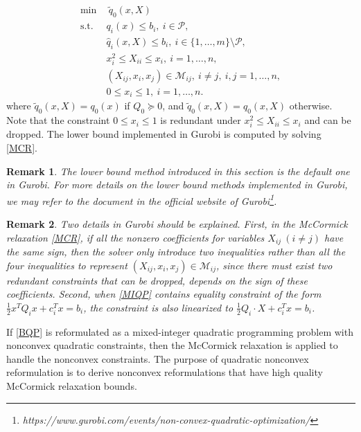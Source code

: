 \documentclass[pdflatex,sn-mathphys-num]{sn-jnl}%
\theoremstyle{thmstyleone}%
\theoremstyle{thmstyletwo}%
\newtheorem{remark}{Remark}%
\theoremstyle{thmstylethree}%
\begin{document}
\begin{equation}\label{MCR}
	\begin{aligned}
		\min ~&~ \tilde{q}_0(x,X) \\
		\mbox{s.t.} ~&q_{i}(x)\leq b_i,~i\in\mathcal{P},\\
		&\hat{q}_{i}(x,X)\leq b_i,~i\in\{1,\ldots,m\}\setminus \mathcal{P},\\
		&x_i^2\leq X_{ii} \leq x_i,~i=1,\ldots,n,\\
		&(X_{ij},x_i,x_j)\in \mathcal{M}_{ij}, ~i\neq j, ~i,j=1,\ldots,n,\\
		&0\leq x_i\leq 1,~i=1,\ldots,n.
	\end{aligned}
\end{equation}
where $\tilde{q}_0(x,X)=q_0(x)$ if $Q_0\succeq 0$, and $\tilde{q}_0(x,X)=\hat{q}_0(x,X)$ otherwise. Note that the constraint $0\leq x_i\leq 1$ is redundant under $x_i^2\leq X_{ii} \leq x_i$ and can be dropped. The lower bound implemented in Gurobi is computed by solving \eqref{MCR}.

\begin{remark}
	The lower bound method introduced in this section is the default one in Gurobi. For more details on the lower bound methods implemented in Gurobi, we may refer to the document in the official website of Gurobi\footnote{{https://www.gurobi.com/events/non-convex-quadratic-optimization/}}.
\end{remark}

\begin{remark}\label{remark:gurobi}
	Two details in Gurobi should be explained. First, in the McCormick relaxation \eqref{MCR}, if all the nonzero coefficients for variables $X_{ij} ~(i\neq j)$ have the same sign, then the solver only introduce two inequalities rather than all the four inequalities to represent $(X_{ij},x_i,x_j)\in \mathcal{M}_{ij}$, since there must exist two redundant constraints that can be dropped, depends on the sign of these coefficients. Second, when \eqref{MIQP} contains equality constraint of the form $\frac{1}{2}x^{T}Q_i x+c_i^{T}x=b_i$, the constraint is also linearized to $\frac{1}{2}Q_i \cdot X+c_i^{T}x=b_i$.
\end{remark}

If \eqref{BQP} is reformulated as a mixed-integer quadratic programming problem with nonconvex quadratic constraints, then the McCormick relaxation is applied to handle the nonconvex constraints. The purpose of quadratic nonconvex reformulation is to derive nonconvex reformulations that have high quality McCormick relaxation bounds.
\end{document}
